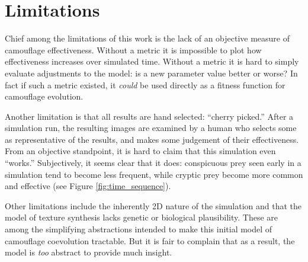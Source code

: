 \documentclass[acmtog]{acmart}
\begin{document}
\par


\section{Limitations}
\label{subsec:limitations}
Chief among the limitations of this work is the lack of an objective measure of camouflage effectiveness. Without a metric it is impossible to plot how effectiveness increases over simulated time. Without a metric it is hard to simply evaluate adjustments to the model: is a new parameter value better or worse? In fact if such a metric existed, it \textit{could} be used directly as a fitness function for camouflage evolution.
\par
Another limitation is that all results are hand selected: “cherry picked.” After a simulation run, the resulting images are examined by a human who selects some as representative of the results, and makes some judgement of their effectiveness. From an objective standpoint, it is hard to claim that this simulation even “works.” Subjectively, it seems clear that it does: conspicuous prey seen early in a simulation tend to become less frequent, while cryptic prey become more common and effective (see Figure \ref{fig:time_sequence}).
\par
Other limitations include the inherently 2D nature of the simulation and that the model of texture synthesis lacks genetic or biological plausibility. These are among the simplifying abstractions intended to make this initial model of camouflage coevolution tractable. But it is fair to complain that as a result, the model is \textit{too} abstract to provide much insight.
\par

\end{document}
